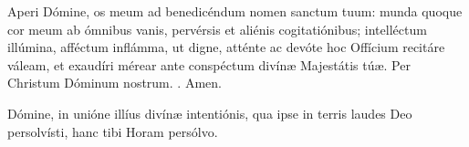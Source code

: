 Aperi Dómine, os meum ad benedicéndum nomen sanctum tuum: munda quoque cor meum ab ómnibus vanis, pervérsis et aliénis cogitatiónibus; intelléctum illúmina, afféctum inflámma, ut digne, atténte ac devóte hoc Offícium recitáre váleam, et exaudíri mérear ante conspéctum divínæ Majestátis túæ. Per Christum Dóminum nostrum. \Rbar. Amen.

Dómine, in unióne illíus divínæ intentiónis, qua ipse in terris laudes Deo persolvísti, hanc tibi Horam persólvo.